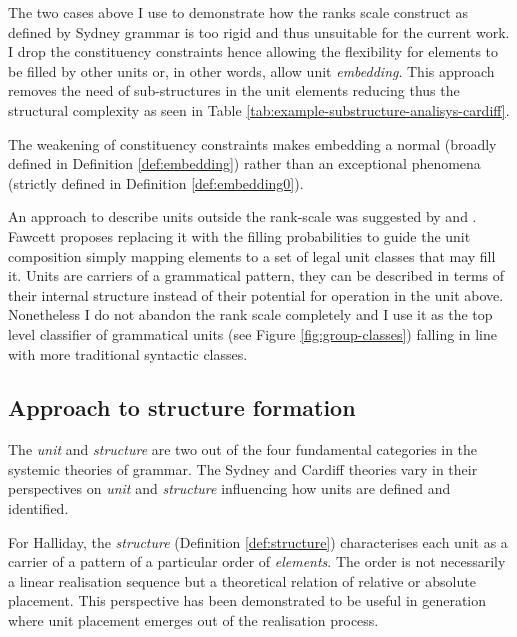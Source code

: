 
The two cases above I use to demonstrate how the ranks scale construct as defined by Sydney grammar is too rigid and thus unsuitable for the current work. 
I drop the constituency constraints hence allowing the flexibility for elements to be filled by other units or, in other words, allow unit \textit{embedding}. This approach removes the need of sub-structures in the unit elements reducing thus the structural complexity as seen in Table \ref{tab:example-substructure-analisys-cardiff}.


The weakening of constituency constraints makes embedding a normal (broadly defined in Definition \ref{def:embedding}) rather than an exceptional phenomena (strictly defined in Definition \ref{def:embedding0}). 

An approach to describe units outside the rank-scale was suggested by \cite{Fawcett2000} and \cite{Butler1985}. Fawcett proposes replacing it with the filling probabilities to guide the unit composition simply mapping elements to a set of legal unit classes that may fill it. Units are carriers of a grammatical pattern, they can be described in terms of their internal structure instead of their potential for operation in the unit above. Nonetheless I do not abandon the rank scale completely and I use it as the top level classifier of grammatical units (see Figure \ref{fig:group-classes}) falling in line with more traditional syntactic classes.

\subsection{Approach to structure formation}
The \textit{unit} and \textit{structure} are two out of the four fundamental categories in the systemic theories of grammar. The Sydney and Cardiff theories vary in their perspectives on \textit{unit} and \textit{structure} influencing how units are defined and identified.

For Halliday, the \textit{structure} (Definition \ref{def:structure}) characterises each unit as a carrier of a pattern of a particular order of \textit{elements}. The order is not necessarily a linear realisation sequence but a theoretical relation of relative or absolute placement. This perspective has been demonstrated to be useful in generation where unit placement emerges out of the realisation process.

